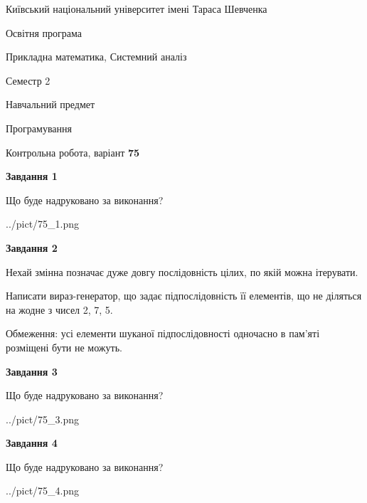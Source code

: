 \documentclass[12pt, ukrainian]{article}
\begin{document}
{{\begin {small}\par
{ \center  Київський національний університет імені Тараса Шевченка \par}
{\parbox {5 cm}{Освітня програма \hfill}{\parbox {8 cm}{Прикладна математика, Системний аналіз \hfill}}\parbox {5 cm}{\hfill Семестр 2}}\par
{\parbox {5 cm} {Навчальний предмет \hfill}\parbox {7 cm}{Програмування \hfill}\parbox {6cm}{\hfill}\par}\vspace{-7pt} \end{small}}{\center Контрольна робота, варіант  \No \textbf
{ 75 }\par}}
{
\begin {large}
{\begin {center}\textbf{Завдання 1}\end {center}}\par
Що буде надруковано за виконання?\par\par
\begin{center}
	{../pict/75_1.png}
\end{center}
\newpage

{\begin {center}\textbf{Завдання 2}\end {center}}\par
Нехай змінна  позначає дуже довгу послідовність цілих, по якій можна ітерувати.

Написати вираз-генератор, що задає підпослідовність її елементів, що не діляться на жодне з чисел 2, 7, 5.

Обмеження: усі елементи шуканої підпослідовності одночасно в пам'яті розміщені бути не можуть.\par
\newpage

{\begin {center}\textbf{Завдання 3}\end {center}}\par
Що буде надруковано за виконання?\par
\begin{center}
	{../pict/75_3.png}
\end{center}
\newpage

{\begin {center}\textbf{Завдання 4}\end {center}}\par
Що буде надруковано за виконання?\par
\begin{center}
	{../pict/75_4.png}
\end{center}
\newpage


\end{large}}
\end{document}
